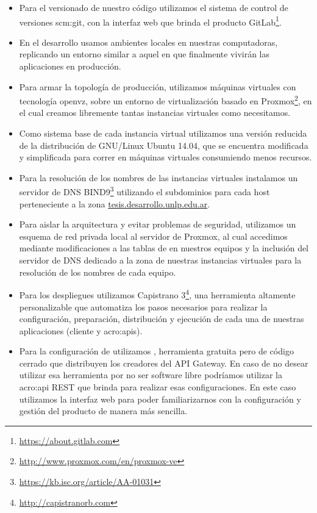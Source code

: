 \begin{itemize}
  \item Para el versionado de nuestro código utilizamos el sistema de control de versiones \gls{scm:git}, con la interfaz web que brinda el producto GitLab\footnote{\url{https://about.gitlab.com}}.

  \item En el desarrollo usamos ambientes locales en nuestras computadoras, replicando un entorno similar a aquel en que finalmente vivirán las aplicaciones en producción.

  \item Para armar la topología de producción, utilizamos máquinas virtuales con tecnología openvz, sobre un entorno de virtualización basado en Proxmox\footnote{\url{http://www.proxmox.com/en/proxmox-ve}}, en el cual creamos libremente tantas instancias virtuales como necesitamos.

  \item Como sistema base de cada instancia virtual utilizamos una versión reducida de la distribución de GNU/Linux Ubuntu 14.04, que se encuentra modificada y simplificada para correr en máquinas virtuales consumiendo menos recursos.

  \item Para la resolución de los nombres de las instancias virtuales instalamos un servidor de DNS BIND9\footnote{\url{https://kb.isc.org/article/AA-01031}} utilizando el subdominios para cada host perteneciente a la zona \url{tesis.desarrollo.unlp.edu.ar}.

  \item Para aislar la arquitectura y evitar problemas de seguridad, utilizamos un esquema de red privada local al servidor de Proxmox, al cual accedimos mediante modificaciones a las tablas de  en nuestros equipos y la inclusión del servidor de DNS dedicado a la zona de nuestras instancias virtuales para la resolución de los nombres de cada equipo.

  \item Para los despliegues utilizamos Capistrano 3\footnote{\url{http://capistranorb.com}}, una herramienta altamente personalizable que automatiza los pasos necesarios para realizar la configuración, preparación, distribución y ejecución de cada una de nuestras aplicaciones (cliente y \glspl{acro:api}).

  \item Para la configuración de  utilizamos , herramienta gratuita pero de código cerrado que distribuyen los creadores del API Gateway. En caso de no desear utilizar esa herramienta por no ser software libre podríamos utilizar la \gls{acro:api} REST que  brinda para realizar esas configuraciones.  En este caso utilizamos la interfaz web para poder familiarizarnos con la configuración y gestión del producto de manera más sencilla.


\end{itemize}
